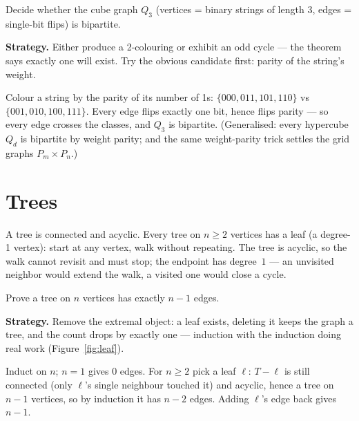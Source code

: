 \begin{example}\label{ex:bipcheck}
Decide whether the cube graph $Q_3$ (vertices = binary strings of
length 3, edges = single-bit flips) is bipartite.
\par\smallskip
\textbf{Strategy.} Either produce a 2-colouring or exhibit an odd
cycle --- the theorem says exactly one will exist. Try the obvious
candidate first: parity of the string's weight.
\par\smallskip
\begin{solution}
Colour a string by the parity of its number of 1s:\newline
$\{000,011,101,110\}$ vs $\{001,010,100,111\}$. Every edge flips
exactly one bit, hence flips
parity --- so every edge crosses the classes, and $Q_3$ is bipartite.
(Generalised: every hypercube $Q_d$ is bipartite by weight parity; and
the same weight-parity trick settles the grid graphs $P_m \times P_n$.)
\end{solution}
\end{example}

\section{Trees}\label{sec:trees}
A tree is connected and acyclic. Every tree on $n \ge 2$ vertices has a
leaf (a degree-1 vertex): start at any vertex, walk without repeating.
The tree is acyclic, so the walk cannot revisit and must stop; the
endpoint has degree~$1$ --- an unvisited neighbor would extend the walk,
a visited one would close a cycle.

\begin{example}\label{ex:tree}
Prove a tree on $n$ vertices has exactly $n - 1$ edges.
\par\smallskip
\textbf{Strategy.} Remove the extremal object: a leaf exists, deleting
it keeps the graph a tree, and the count drops by exactly one ---
induction with the induction doing real work (Figure~\ref{fig:leaf}).
\par\smallskip
\begin{solution}
Induct on $n$; $n = 1$ gives $0$ edges. For $n \ge 2$ pick a leaf
$\ell$: $T - \ell$ is still connected (only $\ell$'s single neighbour
touched it) and acyclic, hence a tree on $n-1$ vertices, so by
induction it has $n - 2$ edges. Adding $\ell$'s edge back gives
$n - 1$.
\end{solution}
\end{example}

